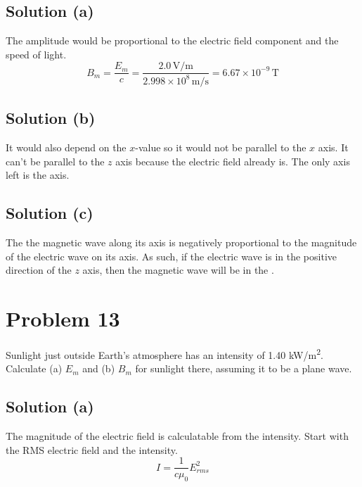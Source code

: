\documentclass[12pt]{article}
\newcommand{\E}[1]{\times 10^{#1}}
\begin{document}
        \subsection{Solution (a)}
            The amplitude would be proportional to the electric field component and the speed of light.
            \begin{equation}
                B_m =   \frac{E_m}{c}
                    =   \frac{2.0\,\unit{\volt/\meter}}{2.998\E{8}\,\unit{\meter/\second}}
                    =   \boxed{6.67\E{-9}\,\unit{\tesla}}
            \end{equation}

        \subsection{Solution (b)}
            It would also depend on the $x$-value so it would not be parallel to the $x$ axis.
            It can't be parallel to the $z$ axis because the electric field already is.
            The only axis left is the  axis.

        \subsection{Solution (c)}
            The the magnetic wave along its axis is negatively proportional to the magnitude of the electric wave on its axis.
            As such, if the electric wave is in the positive direction of the $z$ axis, then the magnetic wave will be in the .

    \pagebreak
    \section{Problem 13}
        Sunlight just outside Earth's atmosphere has an intensity of 1.40 \unit{\kilo\watt/\meter^2}. 
        Calculate (a) $E_m$ and (b) $B_m$ for sunlight there, assuming it to be a plane wave.

        \subsection{Solution (a)}
            The magnitude of the electric field is calculatable from the intensity.
            Start with the RMS electric field and the intensity.
            \begin{equation}
                I = \frac{1}{c \mu_0} E_{rms}^2
            \end{equation}
\end{document}
